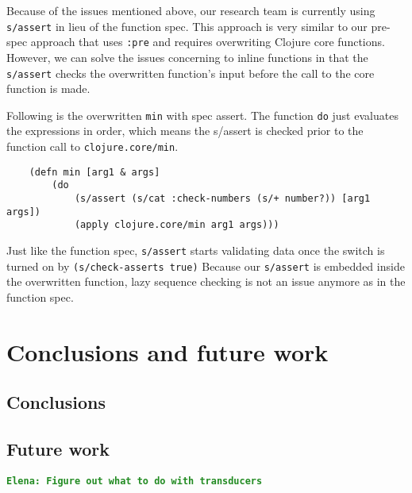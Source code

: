 \documentclass[12pt]{article}
\newcommand{\comment}[1]{{\bf \tt  {#1}}}
\newcommand{\emcomment}[1]{\textcolor{ForestGreen}{\comment{Elena: {#1}}}}
\begin{document}
	Because of the issues mentioned above, our research team is currently using {\tt s/assert} in lieu of the function spec.
	This approach is very similar to our pre-spec approach that uses {\tt :pre} and requires overwriting 
	Clojure core functions. However, we can solve the issues concerning to inline functions in that 
	the {\tt s/assert} checks the overwritten function's input before the call to the core function is made. 
	
	Following is the overwritten {\tt min} with spec assert. The function {\tt do} just evaluates
	the expressions in order, which means the s/assert is checked prior to the function call to {\tt clojure.core/min}.
	\begin{verbatim}
	(defn min [arg1 & args]
  		(do 
    		(s/assert (s/cat :check-numbers (s/+ number?)) [arg1 args])
    		(apply clojure.core/min arg1 args)))
	\end{verbatim} 
	Just like the function spec, {\tt s/assert} starts validating data once the switch is turned on by {\tt (s/check-asserts true)}
	Because our {\tt s/assert} is embedded inside the overwritten function, lazy sequence checking is not
	an issue anymore as in the function spec.
	
	
	
	

\section{Conclusions and future work}
	\subsection{Conclusions}
	\subsection{Future work}
\emcomment{Figure out what to do with transducers}
	


\end{document}
